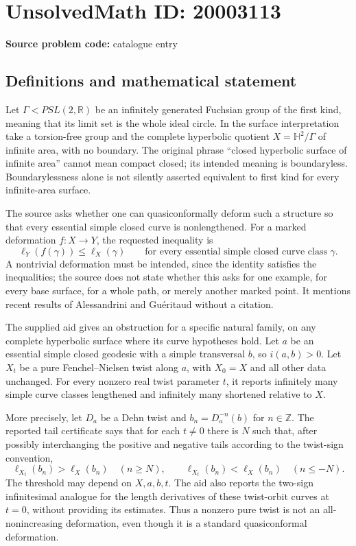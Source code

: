 \documentclass[11pt]{article}
\newcommand{\Z}{\mathbb{Z}}
\newcommand{\R}{\mathbb{R}}
\begin{document}
\section*{UnsolvedMath ID: 20003113}
\textbf{Source problem code:} catalogue entry
\subsection{Definitions and mathematical statement}
Let $\Gamma<PSL(2,\R)$ be an infinitely generated Fuchsian group of the first kind, meaning that its limit set is the whole ideal circle. In the surface interpretation take a torsion-free group and the complete hyperbolic quotient $X=\mathbb H^2/\Gamma$ of infinite area, with no boundary. The original phrase ``closed hyperbolic surface of infinite area'' cannot mean compact closed; its intended meaning is boundaryless. Boundarylessness alone is not silently asserted equivalent to first kind for every infinite-area surface.

The source asks whether one can quasiconformally deform such a structure so that every essential simple closed curve is nonlengthened. For a marked deformation $f:X\to Y$, the requested inequality is
\[
 \ell_Y(f(\gamma))\leq\ell_X(\gamma)
 \qquad\text{for every essential simple closed curve class }\gamma.
\]
A nontrivial deformation must be intended, since the identity satisfies the inequalities; the source does not state whether this asks for one example, for every base surface, for a whole path, or merely another marked point. It mentions recent results of Alessandrini and Gu\'eritaud without a citation.

The supplied aid gives an obstruction for a specific natural family, on any complete hyperbolic surface where its curve hypotheses hold. Let $a$ be an essential simple closed geodesic with a simple transversal $b$, so $i(a,b)>0$. Let $X_t$ be a pure Fenchel--Nielsen twist along $a$, with $X_0=X$ and all other data unchanged. For every nonzero real twist parameter $t$, it reports infinitely many simple curve classes lengthened and infinitely many shortened relative to $X$.

More precisely, let $D_a$ be a Dehn twist and $b_n=D_a^{-n}(b)$ for $n\in\Z$. The reported tail certificate says that for each $t\ne0$ there is $N$ such that, after possibly interchanging the positive and negative tails according to the twist-sign convention,
\[
 \ell_{X_t}(b_n)>\ell_X(b_n)\quad(n\geq N),\qquad
 \ell_{X_t}(b_n)<\ell_X(b_n)\quad(n\leq-N).
\]
The threshold may depend on $X,a,b,t$. The aid also reports the two-sign infinitesimal analogue for the length derivatives of these twist-orbit curves at $t=0$, without providing its estimates. Thus a nonzero pure twist is not an all-nonincreasing deformation, even though it is a standard quasiconformal deformation.
\end{document}
